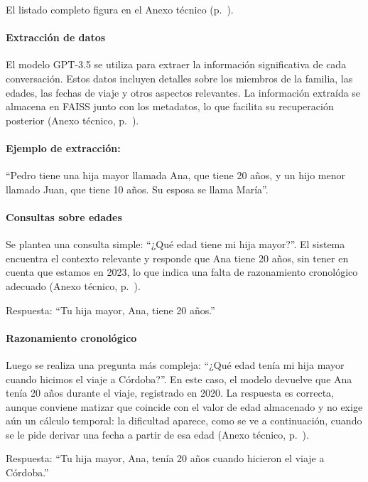 El listado completo figura en el Anexo técnico (p.~\pageref{anexo:code-4-1-10-2}).

\paragraph{Extracción de datos}

El modelo GPT-3.5 se utiliza para extraer la información significativa de cada conversación. Estos datos incluyen detalles sobre los miembros de la familia, las edades, las fechas de viaje y otros aspectos relevantes. La información extraída se almacena en FAISS junto con los metadatos, lo que facilita su recuperación posterior (Anexo técnico, p.~\pageref{anexo:code-4-1-10-3}).

\paragraph{Ejemplo de extracción:}
``Pedro tiene una hija mayor llamada Ana, que tiene 20 años, y un hijo menor llamado Juan, que tiene 10 años. Su esposa se llama María''.

\paragraph{Consultas sobre edades}

Se plantea una consulta simple: ``¿Qué edad tiene mi hija mayor?''. El sistema encuentra el contexto relevante y responde que Ana tiene 20 años, sin tener en cuenta que estamos en 2023, lo que indica una falta de razonamiento cronológico adecuado (Anexo técnico, p.~\pageref{anexo:code-4-1-10-4}).

Respuesta: ``Tu hija mayor, Ana, tiene 20 años.''

\paragraph{Razonamiento cronológico}

Luego se realiza una pregunta más compleja: ``¿Qué edad tenía mi hija mayor cuando hicimos el viaje a Córdoba?''. En este caso, el modelo devuelve que Ana tenía 20 años durante el viaje, registrado en 2020. La respuesta es correcta, aunque conviene matizar que coincide con el valor de edad almacenado y no exige aún un cálculo temporal: la dificultad aparece, como se ve a continuación, cuando se le pide derivar una fecha a partir de esa edad (Anexo técnico, p.~\pageref{anexo:code-4-1-10-5}).

Respuesta: ``Tu hija mayor, Ana, tenía 20 años cuando hicieron el viaje a Córdoba.''

